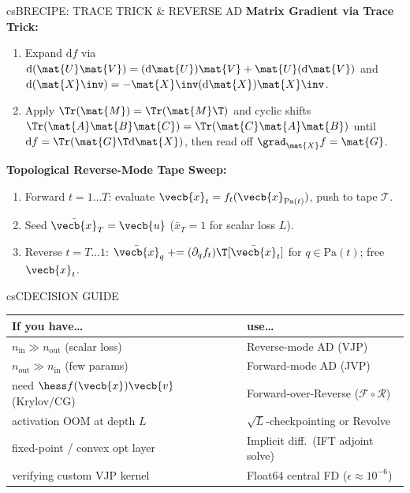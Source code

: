 \documentclass[../../../../master.tex]{subfiles}
\begin{document}
\begin{cscolumns}
\begin{cscard}{csB}{RECIPE: TRACE TRICK \& REVERSE AD}
  \textbf{Matrix Gradient via Trace Trick:}
  \begin{enumerate}[leftmargin=1.2em, itemsep=1pt, topsep=1pt, parsep=0pt]
    \item Expand $\mathrm{d}f$ via $\mathrm{d}(\mat{U}\mat{V})=(\mathrm{d}\mat{U})\mat{V}+\mat{U}(\mathrm{d}\mat{V})$ and $\mathrm{d}(\mat{X}\inv)=-\mat{X}\inv(\mathrm{d}\mat{X})\mat{X}\inv$.
    \item Apply $\Tr(\mat{M})=\Tr(\mat{M}\T)$ and cyclic shifts $\Tr(\mat{A}\mat{B}\mat{C})=\Tr(\mat{C}\mat{A}\mat{B})$ until $\mathrm{d}f=\Tr(\mat{G}\T\mathrm{d}\mat{X})$, then read off $\grad_{\mat{X}} f = \mat{G}$.
  \end{enumerate}
  \vspace{1pt}
  \textbf{Topological Reverse-Mode Tape Sweep:}
  \begin{enumerate}[leftmargin=1.2em, itemsep=1pt, topsep=1pt, parsep=0pt]
    \item Forward $t=1\dots T$: evaluate $\vecb{x}_t = f_t(\vecb{x}_{\mathrm{Pa}(t)})$, push to tape $\mathcal{T}$.
    \item Seed $\bar{\vecb{x}}_T = \vecb{u}$ ($\bar{x}_T = 1$ for scalar loss $L$).
    \item Reverse $t=T\dots 1$: $\bar{\vecb{x}}_q \mathrel{+}= (\partial_q f_t)\T[\bar{\vecb{x}}_t]$ for $q\in\mathrm{Pa}(t)$; free $\vecb{x}_t$.
  \end{enumerate}
\end{cscard}
\columnbreak

\begin{cscard}{csC}{DECISION GUIDE}
  \renewcommand{\arraystretch}{1.22}\small
  \begin{tabular}{@{}>{\raggedright\arraybackslash}p{3.1cm}>{\raggedright\arraybackslash}p{4.6cm}@{}}
    \textbf{If you have\ldots} & \textbf{use\ldots}\\ \hline
    $n_{\mathrm{in}} \gg n_{\mathrm{out}}$ (scalar loss) & Reverse-mode AD (VJP)\\
    $n_{\mathrm{out}} \gg n_{\mathrm{in}}$ (few params) & Forward-mode AD (JVP)\\
    need $\hess f(\vecb{x})\vecb{v}$ (Krylov/CG) & Forward-over-Reverse ($\mathcal{F}\circ\mathcal{R}$)\\
    activation OOM at depth $L$ & $\sqrt{L}$-checkpointing or Revolve\\
    fixed-point / convex opt layer & Implicit diff.\ (IFT adjoint solve)\\
    verifying custom VJP kernel & Float64 central FD ($\epsilon\approx 10^{-6}$)\\
  \end{tabular}
\end{cscard}


\end{cscolumns}
\end{document}
